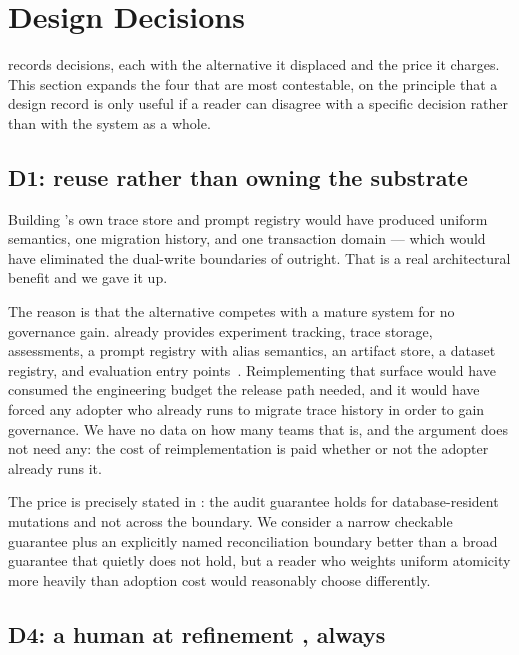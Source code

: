 \section{Design Decisions}
\label{sec:design}



 records \statDecisions{} decisions, each with the
alternative it displaced and the price it charges. This section expands the four
that are most contestable, on the principle that a design record is only useful if
a reader can disagree with a specific decision rather than with the system as a
whole.

\subsection{D1: reuse \mlflow{} rather than owning the substrate}

Building \sys's own trace store and prompt registry would have produced uniform
semantics, one migration history, and one transaction domain --- which would have
eliminated the dual-write boundaries of  outright. That is a
real architectural benefit and we gave it up.

The reason is that the alternative competes with a mature system for no governance
gain. \mlflow{} already provides experiment tracking, trace storage, assessments, a
prompt registry with alias semantics, an artifact store, a dataset registry, and
evaluation entry points~\cite{mlflowgenai,mlflowpromptregistry}. Reimplementing
that surface would have consumed the engineering budget the release path needed,
and it would have forced any adopter who already runs \mlflow{} to migrate trace
history in order to gain governance. We have no data on how many teams that is, and
the argument does not need any: the cost of reimplementation is paid whether or not
the adopter already runs it.

The price is precisely stated in : the audit guarantee holds
for database-resident mutations and not across the \mlflow{} boundary. We consider
a narrow checkable guarantee plus an explicitly named reconciliation boundary
better than a broad guarantee that quietly does not hold, but a reader who weights
uniform atomicity more heavily than adoption cost would reasonably choose
differently.

\subsection{D4: a human at refinement , always}

